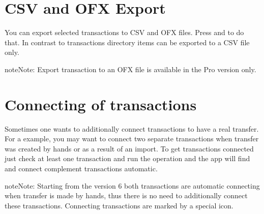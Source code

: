 \documentclass[a4paper,10pt,english]{sphinxmanual}
\begin{document}
\noindent{}
\noindent{}
\noindent{}


\section{CSV and OFX Export}
\label{\detokenize{bulk-actions:csv-and-ofx-export}}
\sphinxAtStartPar
You can export selected transactions to CSV and OFX files. Press 
and  to do that. In contrast to transactions directory items
can be exported to a CSV file only.

\begin{sphinxadmonition}{note}{Note:}
\sphinxAtStartPar
Export transaction to an OFX file is available in the Pro version only.
\end{sphinxadmonition}

\noindent{}
\noindent{}
\noindent{}


\section{Connecting of transactions}
\label{\detokenize{bulk-actions:connecting-of-transactions}}
\sphinxAtStartPar
Sometimes one wants to additionally connect transactions to have a real transfer. For a
example, you may want to connect two separate transactions when transfer was created by hands or
as a result of an import. To get transactions connected just check at least one transaction and
run the operation and the app will find and connect complement transactions automatic.

\noindent{}

\begin{sphinxadmonition}{note}{Note:}
\sphinxAtStartPar
Starting from the version 6 both transactions are automatic connecting when transfer is
made by hands, thus there is no need to additionally connect these transactions. Connecting
transactions are marked by a special icon.
\end{sphinxadmonition}
\end{document}
